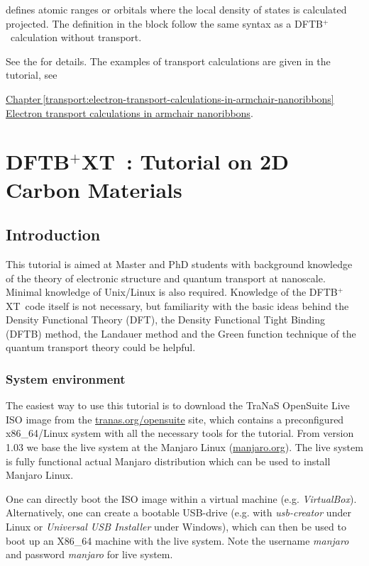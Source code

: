 \documentclass[a4paper,11pt,english]{sphinxmanual}
\newcommand{\dftbp}{\textsf{DFTB$^{\text{+}}$\ }} %
\newcommand{\dftbpxt}{\textsf{DFTB$^{\text{+}}$XT\ }} %
\newcommand{\is}[1]{{\sffamily{#1}}}
\begin{document}
{\is{Region} defines atomic ranges or orbitals where the local density of states is calculated projected. The definition in the block follow the same syntax as a \dftbp calculation without transport.

See the \is{USER MANUAL} for details. The examples of transport calculations are given in the tutorial, see   {\hyperref[transport:electron-transport-calculations-in-armchair-nanoribbons]{Chapter\,\ref{transport:electron-transport-calculations-in-armchair-nanoribbons} Electron transport calculations in armchair nanoribbons}.

\part[\dftbpxt Tutorial on 2D Carbon Materials]{\dftbpxt: \newline  Tutorial on 2D Carbon Materials}
\label{2Dtutorial}    

\chapter{Introduction}
\label{introduction:dftb-tutorial-on-2d-carbon-materials}\label{introduction:introduction}\label{introduction::doc}
This tutorial is aimed at Master and PhD students with
background knowledge of the theory of electronic structure and quantum
transport at nanoscale. Minimal knowledge of Unix/Linux is also
required. Knowledge of the \dftbpxt code itself is not necessary, but
familiarity with the basic ideas behind the Density Functional Theory (DFT), the Density Functional Tight
Binding (DFTB) method, the Landauer method and the Green function technique of the quantum transport theory could be helpful.


\section{System environment}
\label{introduction:system-environment}
The easiest way to use this tutorial is to download the {\textsf{TraNaS OpenSuite Live}} ISO
image from the \href{http://tranas.org/opensuite}{tranas.org/opensuite} site, which contains a preconfigured x86\_64/Linux system with all the
necessary tools for the tutorial. From version 1.03 we base the live system at the  {\textsf{Manjaro Linux}} (\href{https://manjaro.org/}{manjaro.org}). The live system is fully functional actual Manjaro distribution which can be used to install Manjaro Linux. 

One can directly boot the ISO image
within a virtual machine (e.g. \emph{VirtualBox}). Alternatively, one can
create a bootable USB-drive (e.g. with \emph{usb-creator} under Linux or
\emph{Universal USB Installer} under Windows), which can then be
used to boot up an X86\_64 machine with the live system.
Note the username \emph{manjaro} and password \emph{manjaro} for live system.

}}
\end{document}
